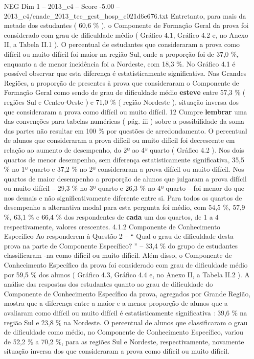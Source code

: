 \begin{textsample}{NEG Dim 1 – 2013\_c4 – Score -5.00 – 2013\_c4/enade\_2013\_tec\_gest\_hosp\_e021d6e676.txt}
Entretanto, para mais da metade dos estudantes ( 60,6 \% ), o Componente de Formação Geral da prova foi considerado com grau de dificuldade médio ( Gráfico 4.1, Gráfico 4.2 e, no Anexo II, a Tabela II.1 ).
O percentual de estudantes que consideraram a prova como difícil ou muito difícil foi maior na região Sul, onde a proporção foi de 37,0 \%, enquanto a de menor incidência foi a Nordeste, com 18,3 \%.
No Gráfico 4.1 é possível observar que esta diferença é estatisticamente significativa.
Nas Grandes Regiões, a proporção de presentes à prova que consideraram o Componente de Formação Geral como sendo de grau de dificuldade médio \textbf{esteve} entre 57,3 \% ( regiões Sul e Centro-Oeste ) e 71,0 \% ( região Nordeste ), situação inversa dos que consideraram a prova como difícil ou muito difícil. 12 Cumpre \textbf{lembrar} uma das convenções para tabelas numéricas ( pág. iii ) sobre a possibilidade da soma das partes não resultar em 100 \% por questões de arredondamento.
O percentual de alunos que consideraram a prova difícil ou muito difícil foi decrescente em relação ao aumento de desempenho, do 2º ao 4º quarto ( Gráfico 4.2 ).
Nos dois quartos de menor desempenho, sem diferença estatisticamente significativa, 35,5 \% no 1º quarto e 37,2 \% no 2º consideraram a prova difícil ou muito difícil.
Nos quartos de maior desempenho a proporção de alunos que julgaram a prova difícil ou muito difícil – 29,3 \% no 3º quarto e 26,3 \% no 4º quarto – foi menor do que nos demais e não significativamente diferente entre si.
Para todos os quartos de desempenho a alternativa modal para esta pergunta foi médio, com 54,5 \%, 57,9 \%, 63,1 \% e 66,4 \% dos respondentes de \textbf{cada} um dos quartos, de 1 a 4 respectivamente, valores crescentes. 4.1.2 Componente de Conhecimento Específico Ao responderem à Questão 2 – “ Qual o grau de dificuldade desta prova na parte de Componente Específico? ” – 33,4 \% do grupo de estudantes classificaram -na como difícil ou muito difícil.
Além disso, o Componente de Conhecimento Específico da prova foi considerado com grau de dificuldade médio por 59,5 \% dos alunos ( Gráfico 4.3, Gráfico 4.4 e, no Anexo II, a Tabela II.2 ).
A análise das respostas dos estudantes quanto ao grau de dificuldade do Componente de Conhecimento Específico da prova, agregados por Grande Região, mostra que a diferença entre a maior e a menor proporção de alunos que a avaliaram como difícil ou muito difícil é estatisticamente significativa : 39,6 \% na região Sul e 23,8 \% na Nordeste.
O percentual de alunos que classificaram o grau de dificuldade como médio, no Componente de Conhecimento Específico, variou de 52,2 \% a 70,2 \%, para as regiões Sul e Nordeste, respectivamente, novamente situação inversa dos que consideraram a prova como difícil ou muito difícil.

\end{textsample}
